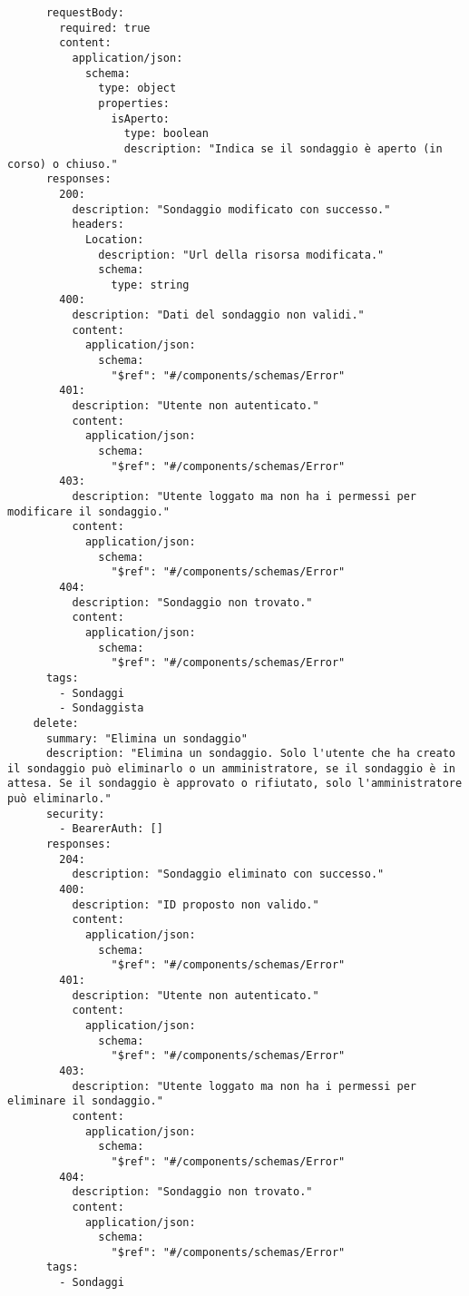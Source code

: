 \begin{verbatim}
      requestBody:
        required: true
        content:
          application/json:
            schema:
              type: object
              properties:
                isAperto:
                  type: boolean
                  description: "Indica se il sondaggio è aperto (in corso) o chiuso."
      responses:
        200:
          description: "Sondaggio modificato con successo."
          headers:
            Location:
              description: "Url della risorsa modificata."
              schema:
                type: string
        400:
          description: "Dati del sondaggio non validi."
          content:
            application/json:
              schema:
                "$ref": "#/components/schemas/Error"
        401:
          description: "Utente non autenticato."
          content:
            application/json:
              schema:
                "$ref": "#/components/schemas/Error"
        403:
          description: "Utente loggato ma non ha i permessi per modificare il sondaggio."
          content:
            application/json:
              schema:
                "$ref": "#/components/schemas/Error"
        404:
          description: "Sondaggio non trovato."
          content:
            application/json:
              schema:
                "$ref": "#/components/schemas/Error"
      tags:
        - Sondaggi
        - Sondaggista
    delete:
      summary: "Elimina un sondaggio"
      description: "Elimina un sondaggio. Solo l'utente che ha creato il sondaggio può eliminarlo o un amministratore, se il sondaggio è in attesa. Se il sondaggio è approvato o rifiutato, solo l'amministratore può eliminarlo."
      security:
        - BearerAuth: []
      responses:
        204:
          description: "Sondaggio eliminato con successo."
        400:
          description: "ID proposto non valido."
          content:
            application/json:
              schema:
                "$ref": "#/components/schemas/Error"
        401:
          description: "Utente non autenticato."
          content:
            application/json:
              schema:
                "$ref": "#/components/schemas/Error"
        403:
          description: "Utente loggato ma non ha i permessi per eliminare il sondaggio."
          content:
            application/json:
              schema:
                "$ref": "#/components/schemas/Error"
        404:
          description: "Sondaggio non trovato."
          content:
            application/json:
              schema:
                "$ref": "#/components/schemas/Error"
      tags:
        - Sondaggi

\end{verbatim}
